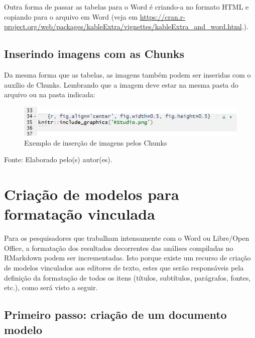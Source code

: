 \documentclass[12pt,brazil,oneside]{book}
\begin{document}
Outra forma de passar as tabelas para o Word é criando-a no formato HTML
e copiando para o arquivo em Word (veja em
\url{https://cran.r-project.org/web/packages/kableExtra/vignettes/kableExtra_and_word.html}.).

\hypertarget{inserindo-imagens-com-as-chunks}{%
\subsection{Inserindo imagens com as
Chunks}\label{inserindo-imagens-com-as-chunks}}

Da mesma forma que as tabelas, as imagens também podem ser inseridas com
o auxílio de Chunks. Lembrando que a imagem deve estar na mesma pasta do
arquivo ou na pasta indicada:

\begin{figure}[H]

{\centering \includegraphics[width=0.8\linewidth]{rmarkchunkimg} 

}

\caption{Exemplo de inserção de imagens pelos Chunks}\label{fig:rmarkchunk333}
\end{figure}

Fonte: Elaborado pelo(s) autor(es).

\hypertarget{criacao-de-modelos-para-formatacao-vinculada}{%
\section{Criação de modelos para formatação
vinculada}\label{criacao-de-modelos-para-formatacao-vinculada}}

Para os pesquisadores que trabalham intensamente com o Word ou
Libre/Open Office, a formatação dos resultados decorrentes das análises
compiladas no RMarkdown podem ser incrementadas. Isto porque existe um
recurso de criação de modelos vinculados aos editores de texto, estes
que serão responsáveis pela definição da formatação de todos os itens
(títulos, subtítulos, parágrafos, fontes, etc.), como será visto a
seguir.

\hypertarget{primeiro-passo-criacao-de-um-documento-modelo}{%
\subsection{Primeiro passo: criação de um documento
modelo}\label{primeiro-passo-criacao-de-um-documento-modelo}}
\end{document}
